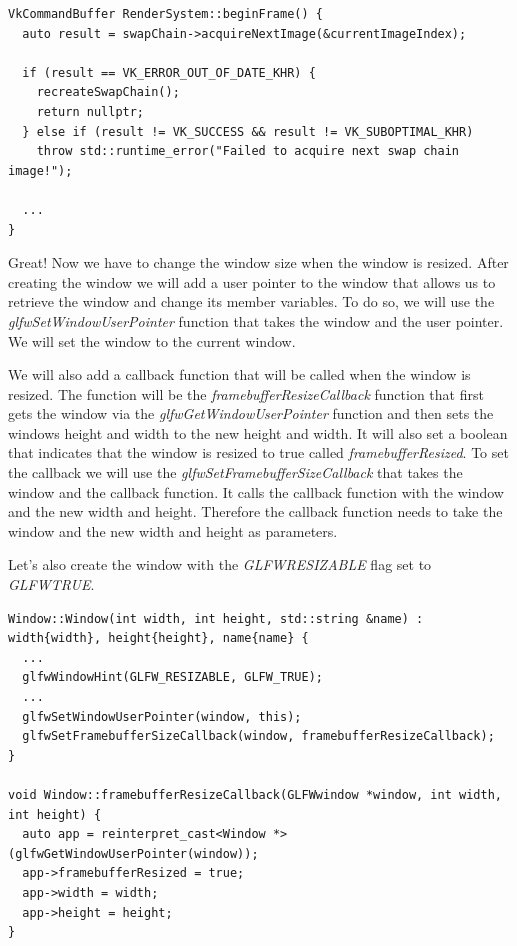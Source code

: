 \documentclass[12pt]{report} \usepackage{preamble}
\begin{document}
\begin{lstlisting}[Language=C++]
VkCommandBuffer RenderSystem::beginFrame() {
  auto result = swapChain->acquireNextImage(&currentImageIndex);

  if (result == VK_ERROR_OUT_OF_DATE_KHR) {
    recreateSwapChain();
    return nullptr;
  } else if (result != VK_SUCCESS && result != VK_SUBOPTIMAL_KHR)
    throw std::runtime_error("Failed to acquire next swap chain image!");

  ...
}
\end{lstlisting}

Great! Now we have to change the window size when the window is resized. After creating the window we will add a user pointer to the window that
allows us to retrieve the window and change its member variables. To do so, we will use the \textit{glfwSetWindowUserPointer} function that takes the window
and the user pointer. We will set the window to the current window.

We will also add a callback function that will be called when the window is resized.
The function will be the \textit{framebufferResizeCallback} function that first gets the window via the \textit{glfwGetWindowUserPointer} function and then
sets the windows height and width to the new height and width.
It will also set a boolean that indicates that the window is resized to true called \textit{framebufferResized}.
To set the callback we will use the \textit{glfwSetFramebufferSizeCallback}
that takes the window and the callback function. It calls the callback function with the window and the new width and height. Therefore the callback function
needs to take the window and the new width and height as parameters.

Let's also create the window with the \textit{GLFW\textunderscore RESIZABLE} flag set to \textit{GLFW\textunderscore TRUE}.

\begin{lstlisting}[Language=C++]
Window::Window(int width, int height, std::string &name) : width{width}, height{height}, name{name} {
  ...
  glfwWindowHint(GLFW_RESIZABLE, GLFW_TRUE);
  ...
  glfwSetWindowUserPointer(window, this);
  glfwSetFramebufferSizeCallback(window, framebufferResizeCallback);
}

void Window::framebufferResizeCallback(GLFWwindow *window, int width, int height) {
  auto app = reinterpret_cast<Window *>(glfwGetWindowUserPointer(window));
  app->framebufferResized = true;
  app->width = width;
  app->height = height;
}
\end{lstlisting}
\end{document}
